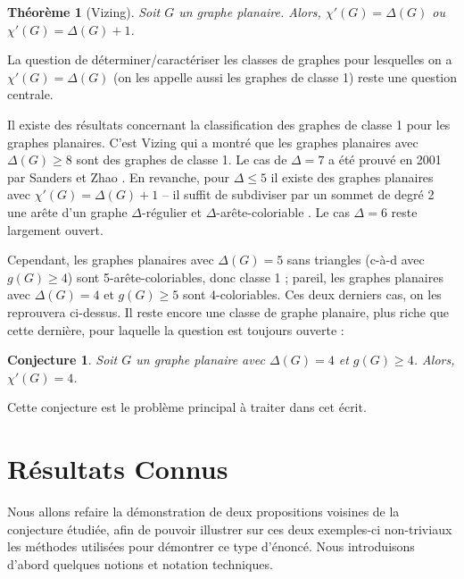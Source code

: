 \documentclass[10pt,a4paper]{article}
\newtheorem{theorem}{Théorème}
\newtheorem{conjecture}{Conjecture}
\begin{document}
\begin{theorem}[Vizing]
Soit $G$ un graphe planaire. Alors, $\chi'(G) = \Delta(G)$ ou $\chi'(G) = \Delta(G) + 1$.
\end{theorem}

La question de déterminer/caractériser les classes de graphes pour lesquelles on a $\chi'(G) = \Delta(G)$ (on les appelle aussi les graphes de classe 1) reste une question centrale. 

Il existe des résultats concernant la classification des graphes de classe 1 pour les graphes planaires.
C'est Vizing \cite{Vizing} qui a montré que les graphes planaires avec $\Delta(G)\ge 8$ sont des graphes de classe 1. Le cas de $\Delta = 7$ a été prouvé en 2001 par Sanders et Zhao \cite{SandersZhao}. 
En revanche, pour $\Delta\le 5$ il existe des graphes planaires avec $\chi'(G)=\Delta(G)+1$ -- il suffit de subdiviser par un sommet de degré 2 une arête d'un graphe $\Delta$-régulier et $\Delta$-arête-coloriable \cite{Vizing2}.
Le cas $\Delta = 6$ reste largement ouvert. 

Cependant, les graphes planaires avec $\Delta(G)=5$ sans triangles (c-à-d avec $g(G)\ge 4$) sont 5-arête-coloriables, donc classe 1 ; pareil, les graphes planaires avec $\Delta(G) = 4$ et $g(G)\ge 5$ sont $4$-coloriables. Ces deux derniers cas, on les reprouvera ci-dessus. Il reste encore une classe de graphe planaire, plus riche que cette dernière, pour laquelle la question est toujours ouverte :

\begin{conjecture}
Soit $G$ un graphe planaire avec $\Delta(G) = 4$ et $g(G) \geq 4$. Alors, $\chi'(G) = 4$. 
\end{conjecture} 

Cette conjecture est le problème principal à traiter dans cet écrit. 

\section{Résultats Connus}
\label{chap:easy}

Nous allons refaire la démonstration de deux propositions voisines de la conjecture étudiée, afin de pouvoir illustrer sur ces deux exemples-ci non-triviaux les méthodes utilisées pour démontrer ce type d'énoncé. Nous introduisons d'abord quelques notions et notation techniques.
\end{document}
